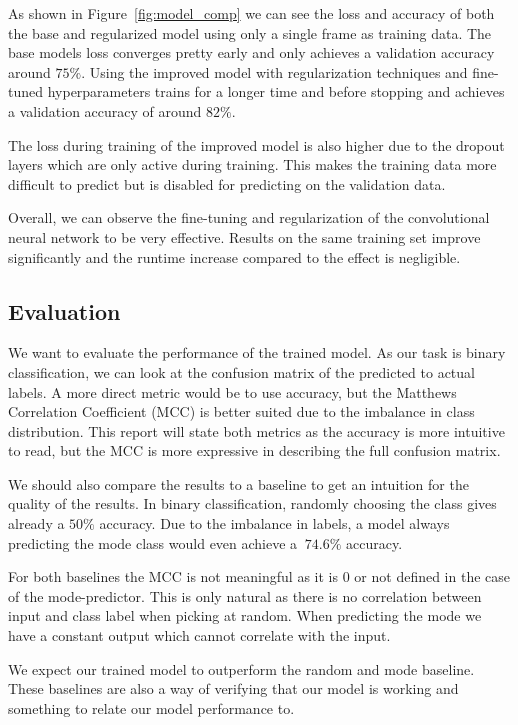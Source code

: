 \documentclass[
a4paper,     %
10pt         %
]{scrartcl}  %
\begin{document}
As shown in Figure~\ref{fig:model_comp} we can see the loss and accuracy of both the base and regularized model using only a single frame as training data.
The base models loss converges pretty early and only achieves a validation accuracy around $75\%$.
Using the improved model with regularization techniques and fine-tuned hyperparameters trains for a longer time and before stopping and achieves a validation accuracy of around $82\%$.

The loss during training of the improved model is also higher due to the dropout layers which are only active during training.
This makes the training data more difficult to predict but is disabled for predicting on the validation data.

Overall, we can observe the fine-tuning and regularization of the convolutional neural network to be very effective.
Results on the same training set improve significantly and the runtime increase compared to the effect is negligible.

\subsection{Evaluation}
We want to evaluate the performance of the trained model.
As our task is binary classification, we can look at the confusion matrix of the predicted to actual labels.
A more direct metric would be to use accuracy, but the Matthews Correlation Coefficient (MCC) is better suited due to the imbalance in class distribution.
This report will state both metrics as the accuracy is more intuitive to read, but the MCC is more expressive in describing the full confusion matrix.

We should also compare the results to a baseline to get an intuition for the quality of the results.
In binary classification, randomly choosing the class gives already a $50\%$ accuracy.
Due to the imbalance in labels, a model always predicting the mode class would even achieve a $~74.6\%$ accuracy.

For both baselines the MCC is not meaningful as it is $0$ or not defined in the case of the mode-predictor.
This is only natural as there is no correlation between input and class label when picking at random.
When predicting the mode we have a constant output which cannot correlate with the input.

We expect our trained model to outperform the random and mode baseline.
These baselines are also a way of verifying that our model is working and something to relate our model performance to.
\end{document}
